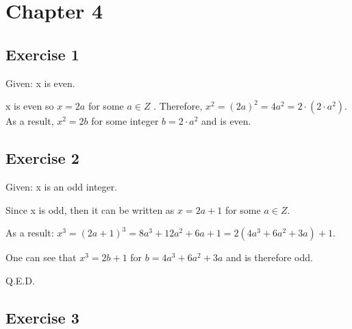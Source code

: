 \documentclass[a4paper]{article}
\begin{document}
\section{Chapter 4}

\subsection{Exercise 1}

Given: x is even.

x is even so $x = 2a$ for some $ a \in Z $ . Therefore,
$ x^2 = (2a)^2 = 4a^2 = 2\cdot(2\cdot a^2)$. As a result, $x^2 = 2b$
for some integer $b = 2 \cdot a^2 $ and is even.

\subsection{Exercise 2}

Given: x is an odd integer.

Since x is odd, then it can be written as $x = 2a+1$ for some $a \in Z$.

As a result:
$x^3 = (2a+1)^3 = 8a^3 + 12a^2 + 6a + 1 = 2\left(4a^3+6a^2+3a\right) + 1 $.

One can see that $x^3 = 2b+1$ for $b = 4a^3+6a^2+3a$ and is therefore odd.

Q.E.D.

\subsection{Exercise 3}
\end{document}
